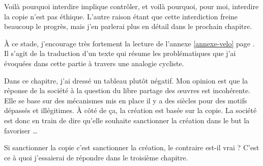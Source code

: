 Voilà pourquoi interdire implique contrôler, et voilà pourquoi, pour moi, interdire la copie n'est pas éthique.
L'autre raison étant que cette interdiction freine beaucoup le progrès, mais j'en parlerai plus en détail dans le prochain chapitre.

À ce stade, j'encourage très fortement la lecture de l'annexe \ref*{annexe-velo} page \pageref{annexe-velo}.
Il s'agit de la traduction d'un texte qui résume les problématiques que j'ai évoquées dans cette partie à travers une analogie cycliste.

\vspace{50pt}

Dans ce chapitre, j'ai dressé un tableau plutôt négatif.
Mon opinion est que la réponse de la société à la question du libre partage des œuvres est incohérente.
Elle se base sur des mécanismes mis en place il y a des siècles pour des motifs dépassés et illégitimes.
À côté de ça, la création est basée sur la copie.
La société est donc en train de dire qu'elle souhaite sanctionner la création dans le but la favoriser \dots{}

Si sanctionner la copie c'est sanctionner la création, le contraire est-il vrai ?
C'est ce à quoi j'essaierai de répondre dans le troisième chapitre.
